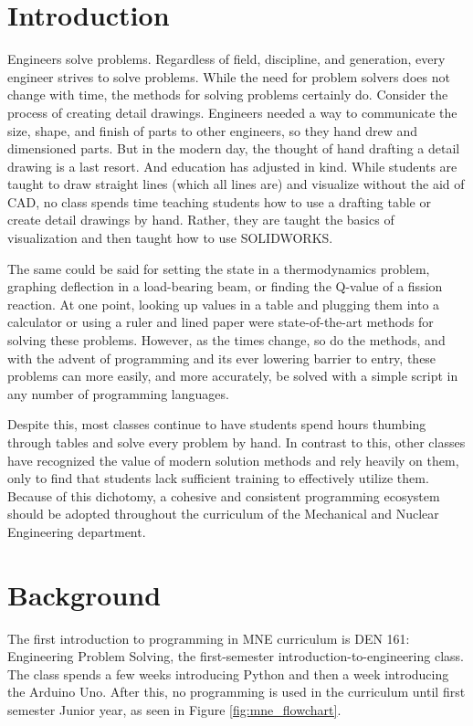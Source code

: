 \section{Introduction}

Engineers solve problems. Regardless of field, discipline, and generation, every engineer
strives to solve problems. While the need for problem solvers does not change with time,
the methods for solving problems certainly do. Consider the process of creating detail 
drawings. Engineers needed a way to communicate the size, shape, and finish of parts to 
other engineers, so they hand drew and dimensioned parts. But in the modern day, the 
thought of hand drafting a detail drawing is a last resort. And education has adjusted in
kind. While students are taught to draw straight lines (which all lines are) and visualize
without the aid of CAD, no class spends time teaching students how to use a drafting table
or create detail drawings by hand. Rather, they are taught the basics of visualization
and then taught how to use SOLIDWORKS.

The same could be said for setting the state in a thermodynamics problem, graphing
deflection in a load-bearing beam, or finding the Q-value of a fission reaction. At one
point, looking up values in a table and plugging them into a calculator or using a ruler
and lined paper were state-of-the-art methods for solving these problems. However, as the 
times change, so do the methods, and with the advent of programming and its ever lowering 
barrier to entry, these problems can more easily, and more accurately, be solved with a 
simple script in any number of programming languages.

Despite this, most classes continue to have students spend hours thumbing through tables
and solve every problem by hand. In contrast to this, other classes have recognized the
value of modern solution methods and rely heavily on them, only to find that students
lack sufficient training to effectively utilize them. Because of this dichotomy, a cohesive 
and consistent programming ecosystem should be adopted throughout the curriculum 
of the Mechanical and Nuclear Engineering department.


\section{Background}

The first introduction to programming in MNE curriculum is DEN 161: Engineering Problem Solving,
the first-semester introduction-to-engineering class. The class spends a few weeks introducing
Python and then a week introducing the Arduino Uno. After this, no programming is used in the
curriculum until first semester Junior year, as seen in Figure \ref{fig:mne_flowchart}. 

